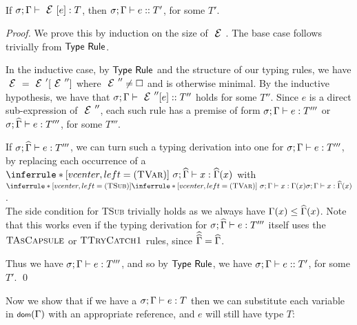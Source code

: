 \SS\begin{Corollary}\ \\
	\indent If $\ty{\E[e]}T$, then $\tye{e}{T'}$, for some $T'$.
\end{Corollary}
\SS\begin{proof}
	We prove this by induction on the size of $\E$.
	The base case follows trivially from $\textsf{Type Rule}$.

	In the inductive case, by $\textsf{Type Rule}$ and the structure of our typing rules, we have $\E = \E'[\E'']$ where $\E'' \neq \hole$ and is otherwise minimal.
	By the inductive hypothesis, we have that $\tye{\E''[e]}{T''}$ holds for some $T''$.
	Since $e$ is a direct sub-expression of $\E''$, each such rule has a premise of form $\ty e{T'''}$ or $\ty[\s][\demut{\G}]e{T'''}$, for some $T'''$.
	
	If $\ty[\s][\demut{\G}]e{T'''}$, we can turn such a typing derivation into one for $\ty e{T'''}$,\\
	\indent by replacing each occurrence of a $\irule{TVar}{\ }{\ty[\s][\demut{\G}]x{\demut{\G}(x)}}$ with $\irule{TSub}{\irule{TVar}{\ }{\ty x{\G(x)}}}{\ty x{\demut{\G}(x)}}$.\\
	The side condition for \textsc{TSub} trivially holds as we always have $\Gamma(x) \leq \widehat{\Gamma}(x)$.
	Note that this works even if the typing derivation for $\ty[\s][\demut{\G}]e{T'''}$ itself uses the $\textsc{TAsCapsule}$ or $\textsc{TTryCatch1}$ rules, since $\widehat{\widehat{\Gamma}} = \widehat{\Gamma}$.
	
	Thus we have $\ty e{T'''}$, and so by $\textsf{Type Rule}$, we have $\tye e{T'}$, for some $T'$.
\qed\end{proof}

Now we show that if we have a $\ty eT$ then we can substitute each variable in $\dom(\G)$ with an appropriate reference, and $e$ will still have type $T$:

